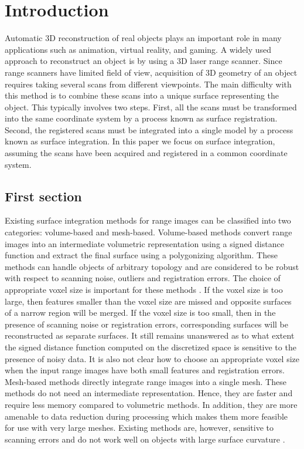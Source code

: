 \chapter{Introduction}
Automatic 3D reconstruction of real objects plays an important role in many applications such as animation, virtual reality, and gaming. A widely used approach to reconstruct an object is by using a 3D laser range scanner. Since range scanners have limited field of view, acquisition of 3D geometry of an object requires taking several scans from different viewpoints. The main difficulty with this method is to combine these scans into a unique surface representing the object. This typically involves two steps. First, all the scans must be transformed into the same coordinate system by a process known as surface registration. Second, the registered scans must be integrated into a single model by a process known as surface integration. In this paper we focus on surface integration, assuming the scans have been acquired and registered in a common coordinate system.

\section{First section}
Existing surface integration methods for range images can be classified into two categories: volume-based and mesh-based. Volume-based methods \cite{Claes:VolM05,Curless:VolM96,Masuda:VolM02,Hoppe:VolM97,Sato:VolM97,Sun:VolM03} convert range images into an intermediate volumetric representation using a signed distance function and extract the final surface using a polygonizing algorithm. These methods can handle objects of arbitrary topology and are considered to be robust with respect to scanning noise, outliers and registration errors. The choice of appropriate voxel size is important for these methods \cite{Claes:VolM05,Curless:VolM96}. If the voxel size is too large, then features smaller than the voxel size are missed and opposite surfaces of a narrow region will be merged. If the voxel size is too small, then in the presence of scanning noise or registration errors, corresponding surfaces will be reconstructed as separate surfaces. It still remains unanswered as to what extent the signed distance function computed on the discretized space is sensitive to the presence of noisy data. It is also not clear how to choose an appropriate voxel size when the input range images have both small features and registration errors. \\

Mesh-based methods \cite{Pito:MeshM96,Rutishauser:MeshM94,Sappa:MeshM00,Soucy:MeshM92,Soucy:MeshM95,Sun:MeshM00,Turk:MeshM94,Zhou:MeshM06} directly integrate range images into a single mesh. These methods do not need an intermediate representation. Hence, they are faster and require less memory compared to volumetric methods. In addition, they are more amenable to data reduction during processing which makes them more feasible for use with very large meshes. Existing methods are, however, sensitive to scanning errors and do not work well on objects with large surface curvature \cite{Curless:VolM96}.

